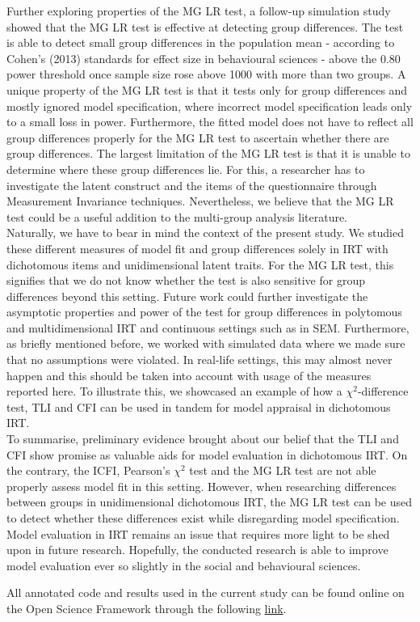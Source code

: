 \documentclass[Royal,sageapa,times,doublespace]{sagej}
\begin{document}
\indent Further exploring properties of the MG LR test, a follow-up simulation study showed that the MG LR test is effective at detecting group differences. The test is able to detect small group differences in the population mean - according to Cohen's (2013) standards for effect size in behavioural sciences - above the 0.80 power threshold once sample size rose above 1000 with more than two groups. A unique property of the MG LR test is that it tests only for group differences and mostly ignored model specification, where incorrect model specification leads only to a small loss in power. Furthermore, the fitted model does not have to reflect all group differences properly for the MG LR test to ascertain whether there are group differences. The largest limitation of the MG LR test is that it is unable to determine where these group differences lie. For this, a researcher has to investigate the latent construct and the items of the questionnaire through Measurement Invariance techniques. Nevertheless, we believe that the MG LR test could be a useful addition to the multi-group analysis literature. \\
\indent Naturally, we have to bear in mind the context of the present study. We studied these different measures of model fit and group differences solely in IRT with dichotomous items and unidimensional latent traits. For the MG LR test, this signifies that we do not know whether the test is also sensitive for group differences beyond this setting. Future work could further investigate the asymptotic properties and power of the test for group differences in polytomous and multidimensional IRT and continuous settings such as in SEM. Furthermore, as briefly mentioned before, we worked with simulated data where we made sure that no assumptions were violated. In real-life settings, this may almost never happen and this should be taken into account with usage of the measures reported here. To illustrate this, we showcased an example of how a $\chi^2$-difference test, TLI and CFI can be used in tandem for model appraisal in dichotomous IRT. \\
\indent To summarise, preliminary evidence brought about our belief that the TLI and CFI show promise as valuable aids for model evaluation in dichotomous IRT. On the contrary, the ICFI, Pearson's $\chi^2$ test and the MG LR test are not able properly assess model fit in this setting. However, when researching differences between groups in unidimensional dichotomous IRT, the MG LR test can be used to detect whether these differences exist while disregarding model specification. Model evaluation in IRT remains an issue that requires more light to be shed upon in future research. Hopefully, the conducted research is able to improve model evaluation ever so slightly in the social and behavioural sciences. 

\begin{sm}
All annotated code and results used in the current study can be found online on the Open Science Framework through the following \href{https://osf.io/dtbcr/?view_only=e32e5f8a43124434b5a53a44ff26ad23}{link}.
\end{sm}

\newpage

\nocite{*}


\end{document}
